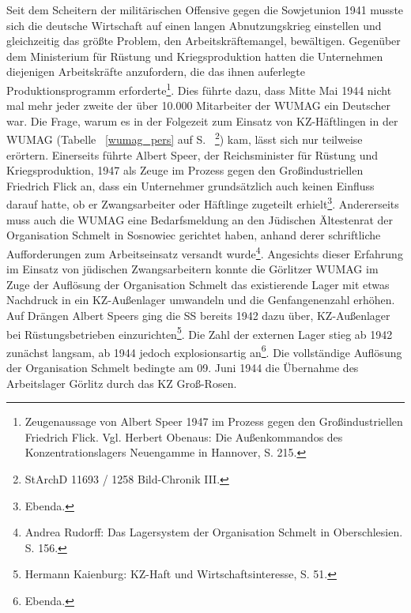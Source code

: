 Seit dem Scheitern der militärischen Offensive gegen die Sowjetunion 1941 musste sich die deutsche Wirtschaft auf einen langen Abnutzungskrieg einstellen und gleichzeitig das größte Problem, den Arbeitskräftemangel, bewältigen. Gegenüber dem Ministerium für Rüstung und Kriegsproduktion hatten die Unternehmen diejenigen Arbeitskräfte anzufordern, die das ihnen auferlegte Produktionsprogramm erforderte\footnote{Zeugenaussage von Albert Speer 1947 im Prozess gegen den Großindustriellen Friedrich Flick. Vgl. Herbert Obenaus: Die Außenkommandos des Konzentrationslagers Neuengamme in Hannover, S. 215.}. Dies führte dazu, dass Mitte Mai 1944 nicht mal mehr jeder zweite der über 10.000 Mitarbeiter der WUMAG ein Deutscher war. Die Frage, warum es in der Folgezeit zum Einsatz von KZ-Häftlingen in der WUMAG (Tabelle ~\ref{wumag_pers} auf S. ~\pageref{wumag_pers}\footnote{StArchD 11693 / 1258 Bild-Chronik III.}) kam, lässt sich nur teilweise erörtern. Einerseits führte Albert Speer, der Reichsminister für Rüstung und Kriegsproduktion, 1947 als Zeuge im Prozess gegen den Großindustriellen Friedrich Flick an, dass ein Unternehmer \glqq grundsätzlich auch keinen Einfluss darauf hatte, ob er Zwangsarbeiter oder Häftlinge zugeteilt erhielt\grqq\footnote{Ebenda.}. Andererseits muss auch die WUMAG eine Bedarfsmeldung an den Jüdischen Ältestenrat der Organisation Schmelt in Sosnowiec gerichtet haben, anhand derer schriftliche Aufforderungen zum Arbeitseinsatz versandt wurde\footnote{Andrea Rudorff: Das Lagersystem der Organisation Schmelt in Oberschlesien. S. 156.}. Angesichts dieser Erfahrung im Einsatz von jüdischen Zwangsarbeitern konnte die Görlitzer WUMAG im Zuge der Auflösung der Organisation Schmelt das existierende Lager mit etwas Nachdruck in ein KZ-Außenlager umwandeln und die Genfangenenzahl erhöhen.
\\
Auf Drängen Albert Speers ging die SS bereits 1942 dazu über, KZ-Außenlager bei Rüstungsbetrieben einzurichten\footnote{Hermann Kaienburg: KZ-Haft und Wirtschaftsinteresse, S. 51.}. Die Zahl der externen Lager stieg ab 1942 zunächst langsam, ab 1944 jedoch explosionsartig an\footnote{Ebenda.}. Die vollständige Auflösung der Organisation Schmelt bedingte am 09. Juni 1944 die Übernahme des Arbeitslager Görlitz durch das KZ Groß-Rosen.
~\newline
